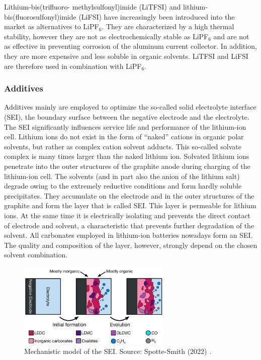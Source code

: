 Lithium-bis(trifluoro- methylsulfonyl)imide (LiTFSI) and lithium-bis(fluorosulfonyl)imide (LiFSI) have increasingly been introduced into the market as alternatives to LiPF$_6$. They are characterized by a high thermal stability, however they are not as electrochemically stable as LiPF$_6$ and are not as effective in preventing corrosion of the aluminum current collector. In addition, they are more expensive and less soluble in organic solvents. LiTFSI and LiFSI are therefore used in combination with LiPF$_6$.

\subsubsection{Additives}
\label{sec:additives}
Additives mainly are employed to optimize the so-called solid electrolyte interface (SEI), the boundary surface between the negative electrode and the electrolyte. The SEI significantly influences service life and performance of the lithium-ion cell.
Lithium ions do not exist in the form of “naked” cations in organic polar solvents, but rather as complex cation solvent adducts. This so-called solvate complex is many times larger than the naked lithium ion.
Solvated lithium ions penetrate into the outer structures of the graphite anode during charging of the lithium-ion cell. The solvents (and in part also the anion of the lithium salt) degrade owing to the extremely reductive conditions and form hardly soluble precipitates. They accumulate on the electrode and in the outer structures of the graphite and form the layer that is called SEI.
This layer is permeable for lithium ions. At the same time it is electrically isolating and prevents the direct contact of electrode and solvent, a characteristic that prevents further degradation of the solvent. All carbonates employed in lithium-ion batteries nowadays form an SEI. The quality and composition of the layer, however, strongly depend on the chosen solvent combination.

\begin{figure}[ht]
    \centering
    \includegraphics[width=0.65\textwidth]{Images/Chapter1/sei.jpeg}
    \caption[Mechanistic model of the SEI]{Mechanistic model of the SEI. Source: Spotte-Smith (2022) \cite{spotte2022toward}.}
    \label{fig:sei}
\end{figure}

